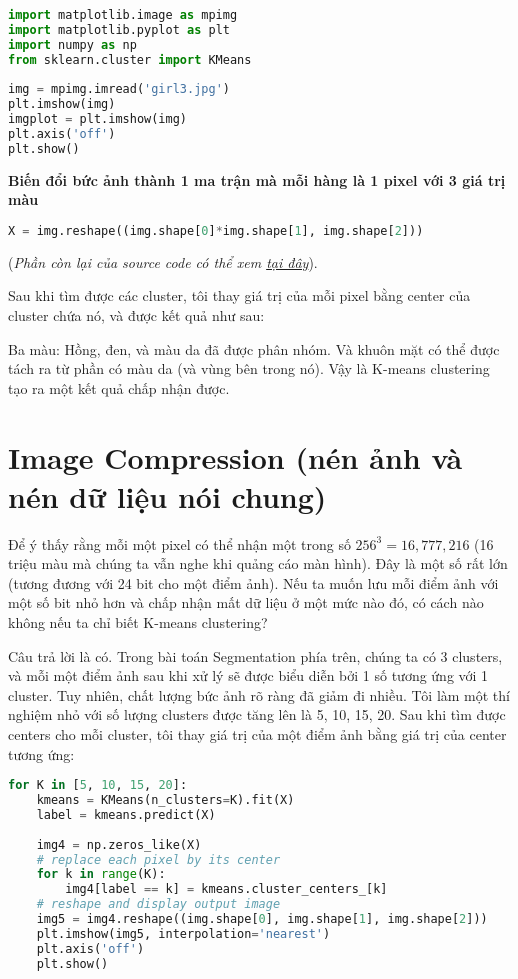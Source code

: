 \begin{lstlisting}[language=Python]
import matplotlib.image as mpimg 
import matplotlib.pyplot as plt 
import numpy as np 
from sklearn.cluster import KMeans 
 
img = mpimg.imread('girl3.jpg') 
plt.imshow(img) 
imgplot = plt.imshow(img) 
plt.axis('off') 
plt.show()  
\end{lstlisting}
 
 
\textbf{Biến đổi bức ảnh thành 1 ma trận mà mỗi hàng là 1 pixel với 3 giá trị màu} 
\begin{lstlisting}[language=Python]
X = img.reshape((img.shape[0]*img.shape[1], img.shape[2])) 
\end{lstlisting}
 
(\textit{Phần còn lại của source code có thể xem \href{https://github.com/tiepvupsu/tiepvupsu.github.io/blob/master/assets/kmeans/Kmeans2.ipynb}{tại đây}}). 
 
Sau khi tìm được các cluster, tôi thay giá trị của mỗi pixel bằng center của cluster chứa nó, và được kết quả như sau: 
 
Ba màu: Hồng, đen, và màu da đã được phân nhóm. Và khuôn mặt có thể được tách ra từ phần có màu da (và vùng bên trong nó). Vậy là K-means clustering tạo ra một kết quả chấp nhận được. 
 
 
\section{Image Compression (nén ảnh và nén dữ liệu nói chung)}
 
Để ý thấy rằng mỗi một pixel có thể nhận một trong số $256^3 = 16,777,216$ (16 triệu màu mà chúng ta vẫn nghe khi quảng cáo màn hình). Đây là một số rất lớn (tương đương với 24 bit cho một điểm ảnh). Nếu ta muốn lưu mỗi điểm ảnh với một số bit nhỏ hơn và chấp nhận mất dữ liệu ở một mức nào đó, có cách nào không nếu ta chỉ biết K-means clustering? 
 
Câu trả lời là có. Trong bài toán Segmentation phía trên, chúng ta có 3 clusters, và mỗi một điểm ảnh sau khi xử lý sẽ được biểu diễn bởi 1 số tương ứng với 1 cluster. Tuy nhiên, chất lượng bức ảnh rõ ràng đã giảm đi nhiều. Tôi làm một thí nghiệm nhỏ với số lượng clusters được tăng lên là 5, 10, 15, 20. Sau khi tìm được centers cho mỗi cluster, tôi thay giá trị của một điểm ảnh bằng giá trị của center tương ứng: 
 
 
\begin{lstlisting}[language=Python]
for K in [5, 10, 15, 20]: 
    kmeans = KMeans(n_clusters=K).fit(X) 
    label = kmeans.predict(X) 
 
    img4 = np.zeros_like(X) 
    # replace each pixel by its center 
    for k in range(K): 
        img4[label == k] = kmeans.cluster_centers_[k] 
    # reshape and display output image 
    img5 = img4.reshape((img.shape[0], img.shape[1], img.shape[2])) 
    plt.imshow(img5, interpolation='nearest') 
    plt.axis('off') 
    plt.show() 
\end{lstlisting}
 
